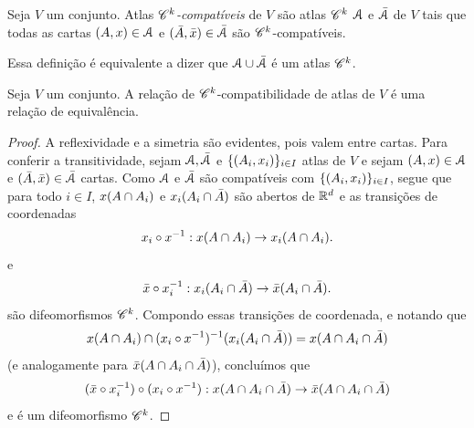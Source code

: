 \begin{definition}
Seja $V$ um conjunto. Atlas \emph{$\mathscr{C}^k$-compatíveis} de $V$ são atlas $\mathscr{C}^k$ $\mathcal{A}$ e $\bar{\mathcal{A}}$ de $V$ tais que todas as cartas $(A,x) \in \mathcal{A}$ e $(\bar A,\bar{x}) \in \bar {\mathcal{A}}$ são $\mathscr{C}^k$-compatíveis.
\end{definition}

Essa definição é equivalente a dizer que $\mathcal{A} \cup \bar {\mathcal{A}}$ é um atlas $\mathscr{C}^k$.

\begin{proposition}
Seja $V$ um conjunto. A relação de $\mathscr{C}^k$-compatibilidade de atlas de $V$ é uma relação de equivalência.
\end{proposition}
\begin{proof}
A reflexividade e a simetria são evidentes, pois valem entre cartas. Para conferir a transitividade, sejam $\mathcal{A},\bar{\mathcal{A}}$ e $\{(A_i,x_i)\}_{i \in I}$ atlas de $V$ e sejam $(A,x) \in \mathcal{A}$ e $(\bar A,\bar{x}) \in \bar{\mathcal{A}}$ cartas. 
Como $\mathcal{A}$ e $\bar{\mathcal{A}}$ são compatíveis com $\{(A_i,x_i)\}_{i \in I}$, segue que para todo $i \in I$, $x(A \cap A_i)$ e $x_i(A_i \cap \bar A)$ são abertos de $\mathbb{R}^d$ e as transições de coordenadas
	\begin{equation*}
	x_i \circ x^{-1}: x(A \cap A_i) \to x_i(A \cap A_i).
	\end{equation*}
e
	\begin{equation*}
	\bar{x} \circ x_i^{-1}: x_i(A_i \cap \bar A) \to \bar{x}(A_i \cap \bar A).
	\end{equation*}
são difeomorfismos $\mathscr{C}^k$. Compondo essas transições de coordenada, e notando que
	\begin{equation*}
	x(A \cap A_i) \cap (x_i \circ x^{-1})^{-1}(x_i(A_i \cap \bar A)) = x(A \cap A_i \cap \bar A)
	\end{equation*}
(e analogamente para $\bar{x}(A \cap A_i \cap \bar A)$), concluímos que
	\begin{equation*}
	(\bar{x} \circ x_i^{-1}) \circ (x_i \circ x^{-1}): x(A \cap A_i \cap \bar A) \to \bar{x}(A \cap A_i \cap \bar A)
	\end{equation*}
e é um difeomorfismo $\mathscr{C}^k$. 


\end{proof}
